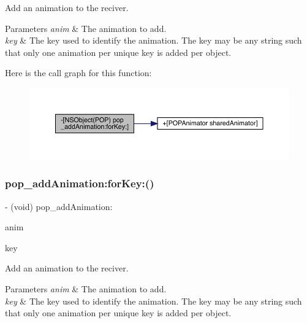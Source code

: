 Add an animation to the reciver. 
\begin{DoxyParams}{Parameters}
{\em anim} & The animation to add. \\
\hline
{\em key} & The key used to identify the animation.  The \textquotesingle{}key\textquotesingle{} may be any string such that only one animation per unique key is added per object. \\
\hline
\end{DoxyParams}
Here is the call graph for this function\+:\nopagebreak
\begin{figure}[H]
\begin{center}
\leavevmode
\includegraphics[width=350pt]{category_n_s_object_07_p_o_p_08_aa41ce0061104fecaceafcbc959967013_cgraph}
\end{center}
\end{figure}
\mbox{\label{category_n_s_object_07_p_o_p_08_aa41ce0061104fecaceafcbc959967013}} 
\subsubsection{\texorpdfstring{pop\+\_\+add\+Animation\+:for\+Key\+:()}{pop\_addAnimation:forKey:()}\hspace{0.1cm}{\footnotesize\ttfamily [2/3]}}
{\footnotesize\ttfamily -\/ (void) pop\+\_\+add\+Animation\+: \begin{DoxyParamCaption}\item[{(\mbox{\hyperlink{interface_p_o_p_animation}{P\+O\+P\+Animation}} $\ast$)}]{anim }\item[{forKey:(N\+S\+String $\ast$)}]{key }\end{DoxyParamCaption}}

Add an animation to the reciver. 
\begin{DoxyParams}{Parameters}
{\em anim} & The animation to add. \\
\hline
{\em key} & The key used to identify the animation.  The \textquotesingle{}key\textquotesingle{} may be any string such that only one animation per unique key is added per object. \\
\hline
\end{DoxyParams}
\mbox{\label{category_n_s_object_07_p_o_p_08_aa41ce0061104fecaceafcbc959967013}} 
